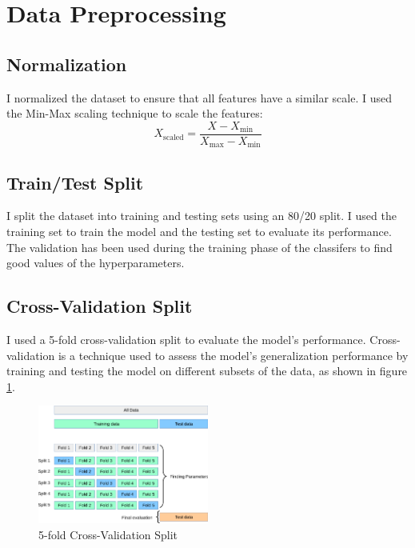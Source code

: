 \documentclass[11.5pt]{article}
\begin{document}
\section{Data Preprocessing} \label{sec:data_preprocessing}
\subsection{Normalization}
I normalized the dataset to ensure that all features have a similar scale. I used the Min-Max scaling technique to scale the features:
\begin{equation}
    X_{\text{scaled}} = \frac{X - X_{\text{min}}}{X_{\text{max}} - X_{\text{min}}}
\end{equation}

\subsection{Train/Test Split} \label{sec:train_test_split}
I split the dataset into training and testing sets using an 80/20 split. I used the training set to train the model and the testing set to evaluate its performance. The validation has been used during the training phase of the classifers to find good values of the hyperparameters.

\subsection{Cross-Validation Split} \label{sec:cross_validation_split}
I used a 5-fold cross-validation split to evaluate the model's performance. Cross-validation is a technique used to assess the model's generalization performance by training and testing the model on different subsets of the data, as shown in figure \ref{fig:cross_validation}.
\begin{figure}[H]
    \centering
    \includegraphics[width=0.5\textwidth]{graphics/grid_search_cross_validation.png}
    \caption{5-fold Cross-Validation Split\cite{31CrossvalidationEvaluating}}
    \label{fig:cross_validation}
\end{figure}
\end{document}
